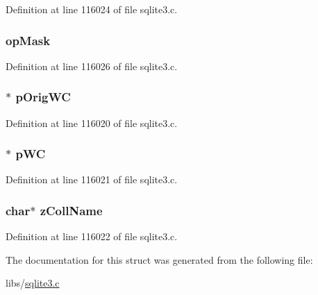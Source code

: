 Definition at line 116024 of file sqlite3.\+c.

\hypertarget{struct_where_scan_a843050c5a17d7b88b9f97b3a0e42c2af}{}
\subsubsection[{op\+Mask}]{ op\+Mask}\label{struct_where_scan_a843050c5a17d7b88b9f97b3a0e42c2af}


Definition at line 116026 of file sqlite3.\+c.

\hypertarget{struct_where_scan_aec9c4ddcc3c94fc133c71da9eeec5a89}{}
\subsubsection[{p\+Orig\+W\+C}]{$\ast$ p\+Orig\+W\+C}\label{struct_where_scan_aec9c4ddcc3c94fc133c71da9eeec5a89}


Definition at line 116020 of file sqlite3.\+c.

\hypertarget{struct_where_scan_ab85657232a3c235326f1e0dd179e32b7}{}
\subsubsection[{p\+W\+C}]{$\ast$ p\+W\+C}\label{struct_where_scan_ab85657232a3c235326f1e0dd179e32b7}


Definition at line 116021 of file sqlite3.\+c.

\hypertarget{struct_where_scan_a5b5fdc17a3a1da384ba0cb3f91772038}{}
\subsubsection[{z\+Coll\+Name}]{\setlength{\rightskip}{0pt plus 5cm}char$\ast$ z\+Coll\+Name}\label{struct_where_scan_a5b5fdc17a3a1da384ba0cb3f91772038}


Definition at line 116022 of file sqlite3.\+c.



The documentation for this struct was generated from the following file\+:\begin{DoxyCompactItemize}
\item 
libs/\hyperlink{sqlite3_8c}{sqlite3.\+c}\end{DoxyCompactItemize}
